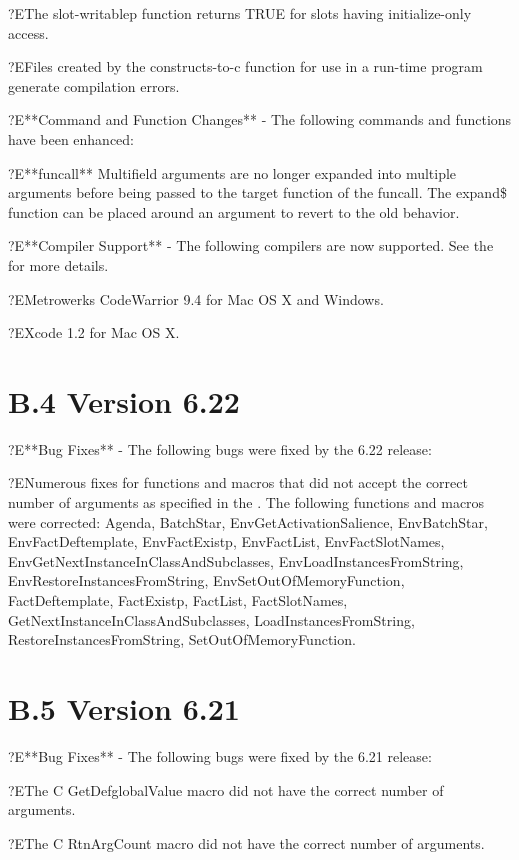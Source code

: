 \documentclass[letterpaper,10pt,english]{sphinxmanual}
\begin{document}
?EThe slot-writablep function returns TRUE for slots having
initialize-only access.

?EFiles created by the constructs-to-c function for use in a run-time
program generate compilation errors.

?E**Command and Function Changes** - The following commands and
functions have been enhanced:

?E**funcall** Multifield arguments are no longer expanded into multiple
arguments before being passed to the target function of the funcall. The
expand\$ function can be placed around an argument to revert to the old
behavior.

?E**Compiler Support** - The following compilers are now supported. See
the  for more details.

?EMetrowerks CodeWarrior 9.4 for Mac OS X and Windows.

?EXcode 1.2 for Mac OS X.


\section{B.4 Version 6.22}
\label{\detokenize{appendix:b-4-version-6-22}}
?E**Bug Fixes** - The following bugs were fixed by the 6.22 release:

?ENumerous fixes for functions and macros that did not accept the
correct number of arguments as specified in the . The following functions and macros were corrected: Agenda,
BatchStar, EnvGetActivationSalience, EnvBatchStar, EnvFactDeftemplate,
EnvFactExistp, EnvFactList, EnvFactSlotNames,
EnvGetNextInstanceInClassAndSubclasses, EnvLoadInstancesFromString,
EnvRestoreInstancesFromString, EnvSetOutOfMemoryFunction,
FactDeftemplate, FactExistp, FactList, FactSlotNames,
GetNextInstanceInClassAndSubclasses, LoadInstancesFromString,
RestoreInstancesFromString, SetOutOfMemoryFunction.


\section{B.5 Version 6.21}
\label{\detokenize{appendix:b-5-version-6-21}}
?E**Bug Fixes** - The following bugs were fixed by the 6.21 release:

?EThe C GetDefglobalValue macro did not have the correct number of
arguments.

?EThe C RtnArgCount macro did not have the correct number of arguments.
\end{document}
